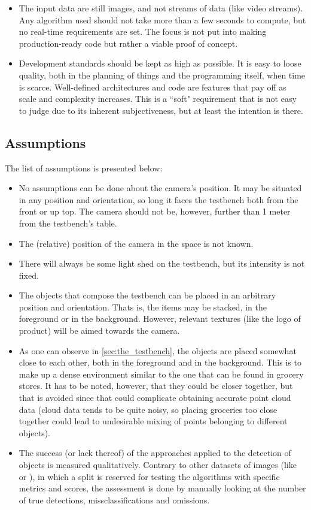 \documentclass[../main.tex]{subfiles}
\begin{document}
\begin{itemize}
    \item The input data are still images, and not streams of data (like video streams). Any algorithm used should not take more than a few seconds to compute, but no real-time requirements are set. The focus is not put into making production-ready code but rather a viable proof of concept.
    \item Development standards should be kept as high as possible. It is easy to loose quality, both in the planning of things and the programming itself, when time is scarce. Well-defined architectures and code are features that pay off as scale and complexity increases. This is a ``soft" requirement that is not easy to judge due to its inherent subjectiveness, but at least the intention is there.
\end{itemize}

\subsection{Assumptions}
The list of assumptions is presented below:
\begin{itemize}
    \item No assumptions can be done about the camera's position. It may be situated in any position and orientation, so long it faces the testbench both from the front or up top. The camera should not be, however, further than 1 meter from the testbench's table.
    \item The (relative) position of the camera in the space is not known.
    \item There will always be some light shed on the testbench, but its intensity is not fixed.
    \item The objects that compose the testbench can be placed in an arbitrary position and orientation. Thats is, the items may be stacked, in the foreground or in the background. However, relevant textures (like the logo of product) will be aimed towards the camera.
    \item As one can observe in \ref{sec:the_testbench}, the objects are placed somewhat close to each other, both in the foreground and in the background. This is to make up a dense environment similar to the one that can be found in grocery stores. It has to be noted, however, that they could be closer together, but that is avoided since that could complicate obtaining accurate point cloud data (cloud data tends to be quite noisy, so placing groceries too close together could lead to undesirable mixing of points belonging to different objects).
    \item The success (or lack thereof) of the approaches applied to the detection of objects is measured qualitatively. Contrary to other datasets of images (like \cite{freiburg_dataset} or \cite{rpc_dataset}), in which a split is reserved for testing the algorithms with specific metrics and scores, the assessment is done by manually looking at the number of true detections, missclassifications and omissions.
\end{itemize}
\end{document}
